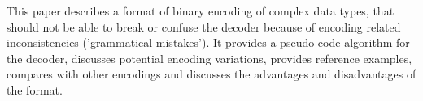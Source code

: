 This paper describes a format of binary encoding of complex data types,
that should not be able to
break or confuse the decoder because of encoding related inconsistencies
('grammatical mistakes').
It provides a pseudo code algorithm for the decoder,
discusses potential encoding variations, provides reference examples,
compares with other encodings and discusses the advantages
and disadvantages of the format.
